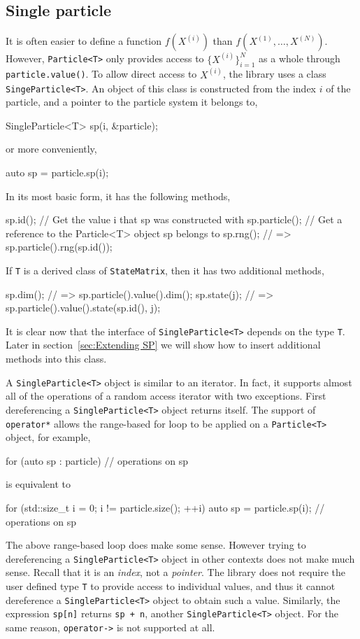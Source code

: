 \subsection{Single particle}
\label{sub:Single particle}

It is often easier to define a function $f(X^{(i)})$ than
$f(X^{(1)},\dots,X^{(N)})$. However, \verb|Particle<T>| only provides access to
$\{X^{(i)}\}_{i=1}^N$ as a whole through \verb|particle.value()|. To allow
direct access to $X^{(i)}$, the library uses a class \verb|SingeParticle<T>|.
An object of this class is constructed from the index $i$ of the particle, and
a pointer to the particle system it belongs to,
\begin{cppcode}
  SingleParticle<T> sp(i, &particle);
\end{cppcode}
or more conveniently,
\begin{cppcode}
  auto sp = particle.sp(i);
\end{cppcode}
In its most basic form, it has the following methods,
\begin{cppcode}
  sp.id();       // Get the value i that sp was constructed with
  sp.particle(); // Get a reference to the Particle<T> object sp belongs to
  sp.rng();      // => sp.particle().rng(sp.id());
\end{cppcode}
If \verb|T| is a derived class of \verb|StateMatrix|, then it has two
additional methods,
\begin{cppcode}
  sp.dim();    // => sp.particle().value().dim();
  sp.state(j); // => sp.particle().value().state(sp.id(), j);
\end{cppcode}
It is clear now that the interface of \verb|SingleParticle<T>| depends on the
type \verb|T|. Later in section~\ref{sec:Extending SP} we will show how to
insert additional methods into this class.

A \verb|SingleParticle<T>| object is similar to an iterator. In fact, it
supports almost all of the operations of a random access iterator with two
exceptions. First dereferencing a \verb|SingleParticle<T>| object returns
itself. The support of \verb|operator*| allows the range-based for loop to be
applied on a \verb|Particle<T>| object, for example,
\begin{cppcode}
  for (auto sp : particle) {
      // operations on sp
  }
\end{cppcode}
is equivalent to
\begin{cppcode}
  for (std::size_t i = 0; i != particle.size(); ++i) {
      auto sp = particle.sp(i);
      // operations on sp
  }
\end{cppcode}
The above range-based loop does make some sense. However trying to
dereferencing a \verb|SingleParticle<T>| object in other contexts does not make
much sense.  Recall that it is an \emph{index}, not a \emph{pointer}. The
library does not require the user defined type \verb|T| to provide access to
individual values, and thus it cannot dereference a \verb|SingleParticle<T>|
object to obtain such a value. Similarly, the expression \verb|sp[n]| returns
\verb|sp + n|, another \verb|SingleParticle<T>| object. For the same reason,
\verb|operator->| is not supported at all.

